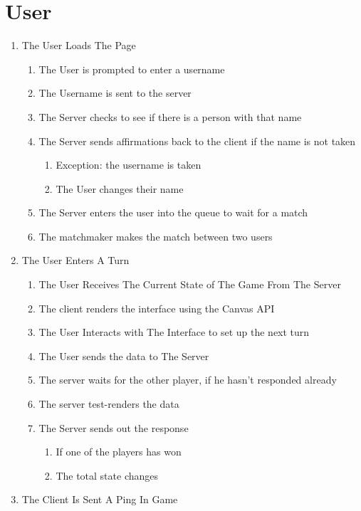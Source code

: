 \documentclass[11pt]{article}
\author{leeyman}
\date{\today}
\title{}
\begin{document}
\tableofcontents

\section{User}
\label{sec:orgcc343a5}
\begin{enumerate}
\item The User Loads The Page
\begin{enumerate}
\item The User is prompted to enter a username
\item The Username is sent to the server
\item The Server checks to see if there is a person with that name
\item The Server sends affirmations back to the client if the name is not taken
\begin{enumerate}
\item Exception: the username is taken
\item The User changes their name
\end{enumerate}
\item The Server enters the user into the queue to wait for a match
\item The matchmaker makes the match between two users
\end{enumerate}
\item The User Enters A Turn
\begin{enumerate}
\item The User Receives The Current State of The Game From The Server
\item The client renders the interface using the Canvas API
\item The User Interacts with The Interface to set up the next turn
\item The User sends the data to The Server
\item The server waits for the other player, if he hasn't responded already
\item The server test-renders the data
\item The Server sends out the response
\begin{enumerate}
\item If one of the players has won
\item The total state changes
\end{enumerate}
\end{enumerate}
\item The Client Is Sent A Ping In Game
\begin{enumerate}

\end{enumerate}
\end{enumerate}
\end{document}
